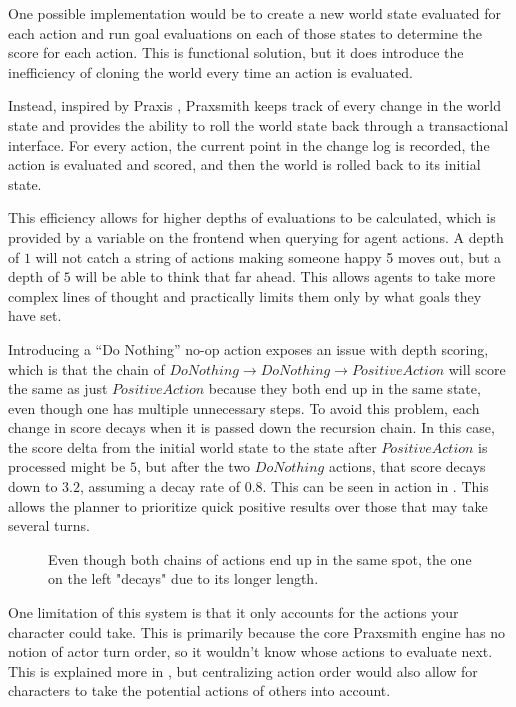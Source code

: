 One possible implementation would be to create a new world state evaluated for each
action and run goal evaluations on each of those states to determine the score for
each action. This is functional solution, but it does
introduce the inefficiency of cloning the world every time an action is evaluated.

Instead, inspired by Praxis \cite{evans_ai_2015}, Praxsmith keeps track of every change
in the world state and provides the ability to roll the world state back through a transactional
interface. For every action, the current point in the change log is recorded, the action is
evaluated and scored, and then the world is rolled back to its initial state.

This efficiency allows for higher depths of evaluations to be calculated, which is
provided by a variable on the frontend when querying for agent actions. A depth of $1$
will not catch a string of actions making someone happy 5 moves out, but a depth of
$5$ will be able to think that far ahead. This allows agents to take more complex lines
of thought and practically limits them only by what goals they have set.

Introducing a ``Do Nothing'' no-op action exposes an issue with depth scoring, which is
that the chain of $Do Nothing \rightarrow Do Nothing \rightarrow Positive Action$
will score the same as just $Positive Action$ because they both end up in the same state,
even though one has multiple unnecessary steps. To avoid this problem, each change in score
decays when it is passed down the recursion chain. In this case, the score delta from
the initial world state to the state after $Positive Action$ is processed might be $5$,
but after the two $Do Nothing$ actions, that score decays down to $3.2$, assuming a
decay rate of $0.8$. This can be seen in action in . This allows
the planner to prioritize quick positive results over those that may take several turns.

\begin{figure}
    \centering
    \begin{tikzpicture}[scale=1.25]
        
    \end{tikzpicture}
    \caption{Even though both chains of actions end up in the same spot, the one on the left "decays" due to its longer length.}
    \label{fig:ScoreDecay}
\end{figure}

One limitation of this system is that it only accounts for the actions your character
could take. This is primarily because the core Praxsmith engine has no notion of
actor turn order, so it wouldn't know whose actions to evaluate next. This is explained
more in , but centralizing action order would also allow
for characters to take the potential actions of others into account.
